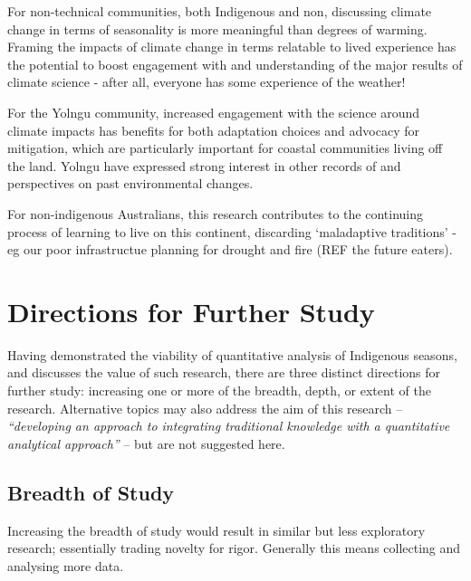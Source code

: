 For non-technical communities, both Indigenous and non, discussing climate
change in terms of seasonality is more meaningful than degrees of warming.
Framing the impacts of climate change in terms relatable to lived experience
has the potential to boost engagement with and understanding of the major
results of climate science - after all, everyone has some experience of the
weather!

For the Yolngu community, increased engagement with the science around climate
impacts has benefits for both adaptation choices and advocacy for mitigation,
which are particularly important for coastal communities living off the land.
Yolngu have expressed strong interest in other records of and perspectives on
past environmental changes.

For non-indigenous Australians, this research contributes to the continuing
process of learning to live on this continent, discarding `maladaptive traditions'
- eg our poor infrastructue planning for drought and fire (REF the future eaters).



\section{Directions for Further Study}
\label{sec:further-study}

Having demonstrated the viability of quantitative analysis of Indigenous
seasons, and discusses the value of such research, there are three distinct
directions for further study:  increasing one or more of the breadth, depth,
or extent of the research.  Alternative topics may also address the aim
of this research -- \textit{``developing an approach to integrating traditional
knowledge with a quantitative analytical approach''} -- but are not suggested
here.


\subsection{Breadth of Study}

Increasing the breadth of study would result in similar but less exploratory
research; essentially trading novelty for rigor.  Generally this means
collecting and analysing more data.

